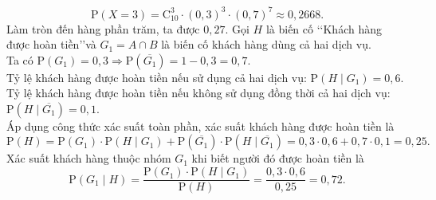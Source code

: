 \begin{ex}
{\begin{itemchoice}
			\[\mathrm{P}(X=3) = \mathrm{C}_{10}^3 \cdot (0{,}3)^3 \cdot (0{,}7)^7 \approx 0{,}2668.\]
			Làm tròn đến hàng phần trăm, ta được $0{,}27$.
			\itemch Gọi $H$ là biến cố \lq\lq Khách hàng được hoàn tiền\rq\rq và $G_1 = A \cap B$ là biến cố khách hàng dùng cả hai dịch vụ. \\
			Ta có $\mathrm{P}(G_1) = 0{,}3 \Rightarrow \mathrm{P}(\overline{G_1}) = 1 - 0{,}3 = 0{,}7$. \\
			Tỷ lệ khách hàng được hoàn tiền nếu sử dụng cả hai dịch vụ: $\mathrm{P}(H \mid G_1) = 0{,}6$. \\
			Tỷ lệ khách hàng được hoàn tiền nếu không sử dụng đồng thời cả hai dịch vụ: $\mathrm{P}(H \mid \overline{G_1}) = 0{,}1$. \\
			Áp dụng công thức xác suất toàn phần, xác suất khách hàng được hoàn tiền là
			\[\mathrm{P}(H) = \mathrm{P}(G_1) \cdot \mathrm{P}(H \mid G_1) + \mathrm{P}(\overline{G_1}) \cdot \mathrm{P}(H \mid \overline{G_1}) = 0{,}3 \cdot 0{,}6 + 0{,}7 \cdot 0{,}1 = 0{,}25.\]
			Xác suất khách hàng thuộc nhóm $G_1$ khi biết người đó được hoàn tiền là
			\[\mathrm{P}(G_1 \mid H) = \dfrac{\mathrm{P}(G_1) \cdot \mathrm{P}(H \mid G_1)}{\mathrm{P}(H)} = \dfrac{0{,}3 \cdot 0{,}6}{0{,}25} = 0{,}72.\]
		\end{itemchoice}
	}
\end{ex}

